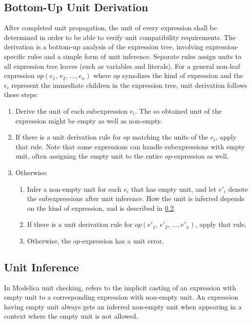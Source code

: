 \subsection{Bottom-Up Unit Derivation}\label{bottom-up-unit-derivation}

After completed unit propagation, the unit of every expression shall be determined in order to be able to verify unit compatibility requirements.
The derivation is a bottom-up analysis of the expression tree, involving expression-specific rules and a simple form of unit inference.
Separate rules assign units to all expression tree leaves (such as variables and literals).
For a general non-leaf expression $\mathit{op}(e_{1},\, e_{2},\, \ldots, e_{n})$ where $\mathit{op}$ symolizes the kind of expression and the $e_{i}$ represent the immediate children in the expression tree, unit derivation follows these steps:
\begin{enumerate}
\item
  Derive the unit of each subexpression $e_{i}$.
  The so obtained unit of the expression might be empty as well as non-empty.
\item
  If there is a unit derivation rule for $\mathit{op}$ matching the units of the $e_{i}$, apply that rule.
  Note that some expressions can handle subexpressions with empty unit, often assigning the empty unit to the entire $\mathit{op}$-expression as well.
\item
  Otherwise:
  \begin{enumerate}
  \def\labelenumii{\alph{enumii}.}
  \item
    Infer a non-empty unit for each $e_{i}$ that has empty unit, and let $e'_{i}$ denote the subexpressions after unit inference.
    How the unit is inferred depends on the kind of expression, and is described in \cref{unit-inference}.
  \item
    If there is a unit derivation rule for $\mathit{op}(e'_{1},\, e'_{2},\, \ldots, e'_{n})$, apply that rule.
  \item
    Otherwise, the $\mathit{op}$-expression has a unit error.
  \end{enumerate}
\end{enumerate}


\subsection{Unit Inference}\label{unit-inference}

In Modelica unit checking,  refers to the implicit casting of an expression with empty unit to a corresponding expression with non-empty unit.
An expression having empty unit always gets an inferred non-empty unit when appearing in a context where the empty unit is not allowed.

